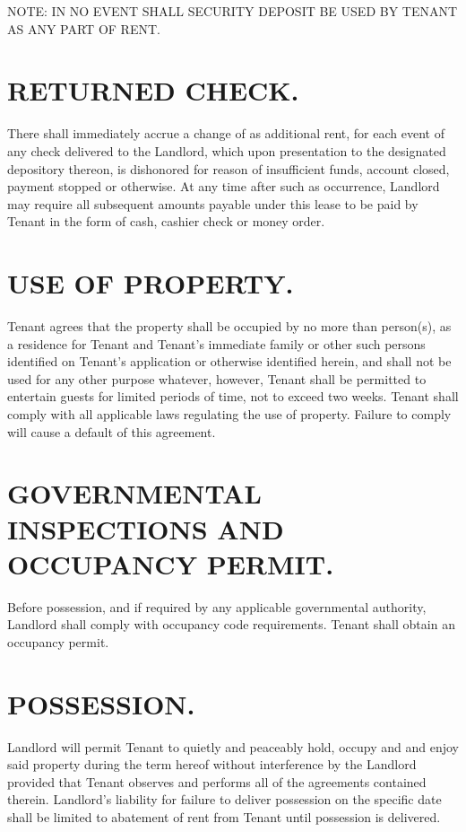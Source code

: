 \documentclass[9pt]{article}
\renewcommand{\MaxTenantsAllowed}{{{MAXTENANTS}}}
\begin{document}
	\noindent NOTE: IN NO EVENT SHALL SECURITY DEPOSIT BE USED BY TENANT AS ANY PART OF RENT.
	
	\section{RETURNED CHECK.}
	There shall immediately accrue a change of \SmallBox{\$\returnedcheckfee} as additional rent, for each event of any check delivered to the Landlord, which upon presentation to the designated depository thereon, is dishonored for reason of insufficient funds, account closed, payment stopped or otherwise. At any time after such as occurrence, Landlord may require all subsequent amounts payable under this lease to be paid by Tenant in the form of cash, cashier check or money order.
	
	\section{USE OF PROPERTY.}
	Tenant agrees that the property shall be occupied by no more than \TinyBox{\MaxTenantsAllowed} person(s), as a residence for Tenant and Tenant's immediate family or other such persons identified on Tenant's application or otherwise identified herein, and shall not be used for any other purpose whatever, however, Tenant shall be permitted to entertain guests for limited periods of time, not to exceed two weeks. Tenant shall comply with all applicable laws regulating the use of property. Failure to comply will cause a default of this agreement.
	
	\section{GOVERNMENTAL INSPECTIONS AND OCCUPANCY PERMIT.}
	Before possession, and if required by any applicable governmental authority, Landlord shall comply with occupancy code requirements. Tenant shall obtain an occupancy permit.
	
	\section{POSSESSION.}
	Landlord will permit Tenant to quietly and peaceably hold, occupy and and enjoy said property during the term hereof without interference by the Landlord provided that Tenant observes and performs all of the agreements contained therein. Landlord's liability for failure to deliver possession on the specific date shall be limited to abatement of rent from Tenant until possession is delivered.
	
\end{document}
